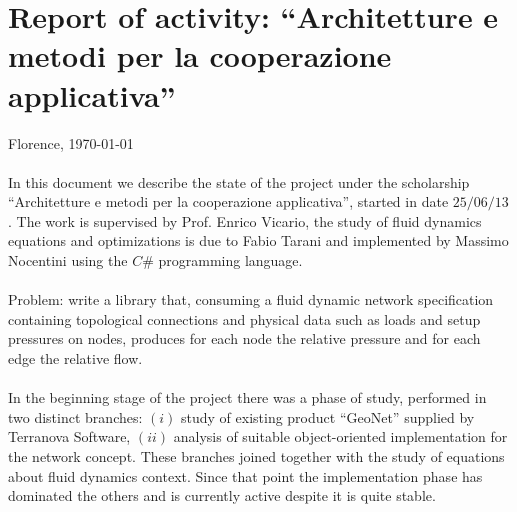 \documentclass[twoside,openright,titlepage,fleqn,
headinclude,11pt,a4paper,BCOR5mm,footinclude ]{scrbook}
\begin{document}
\frenchspacing
\raggedbottom
{}
\pagestyle{plain}
%
\pagestyle{scrheadings}

\lstset{
	language = java
	, numbers = left 
	, basicstyle=\sffamily%
	, tabsize=2
	, captionpos=b
	, breaklines=true
	, showspaces=false
	, showstringspaces=false
}
\chapter*{Report of activity: ``Architetture e metodi per la 
cooperazione applicativa'' }
Florence, \today\\\\
In this document we describe the state of the project under the scholarship 
``Architetture e metodi per la cooperazione applicativa'', started in date
 $25/06/13$.  The work is supervised by Prof. Enrico Vicario, the study of
fluid dynamics equations and optimizations is due to Fabio Tarani and
implemented by Massimo Nocentini using the $C\#$ programming language.
\\\\
Problem: write a library that, consuming a fluid dynamic network specification 
containing topological connections and physical data such as loads and
setup pressures on nodes, produces for each node the relative pressure and for
each edge the relative flow.
\\\\
In the beginning stage of the project there was a phase of study, performed in
two distinct branches: $(i)$ study of existing product ``GeoNet'' supplied by
Terranova Software, $(ii)$ analysis of suitable object-oriented implementation
for the network concept. These branches joined together with the study of equations
about fluid dynamics context. Since that point the implementation phase has 
dominated the others and is currently active despite it is quite stable.
\end{document}
